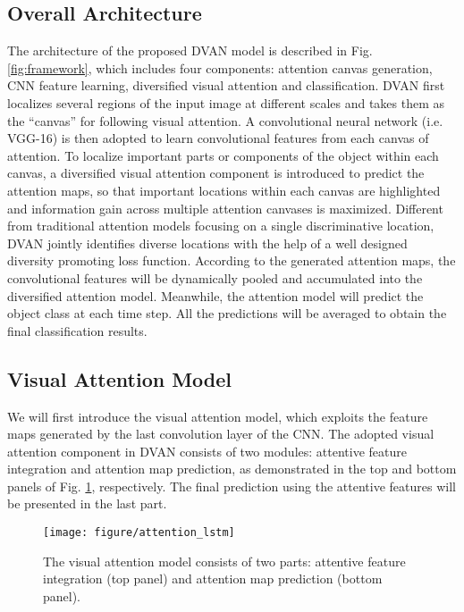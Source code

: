 \documentclass[journal]{IEEEtran}
\begin{document}
\subsection{Overall Architecture}
\label{sec:Arch}
The architecture of the proposed DVAN model is described in Fig. \ref{fig:framework}, which includes four components: attention canvas generation, CNN feature learning, diversified visual attention and classification. DVAN first localizes several regions of the input image at different scales and takes them as the ``canvas'' for following visual attention. A convolutional neural network (i.e. VGG-16) is then adopted to learn convolutional features from each canvas of attention. To localize important parts or components of the object within each canvas, a diversified visual attention component is introduced to predict the attention maps, so that important locations within each canvas are highlighted and information gain across multiple attention canvases is maximized. Different from traditional attention models focusing on a single discriminative location, DVAN jointly identifies diverse locations with the help of a well designed diversity promoting loss function. According to the generated attention maps, the convolutional features will be dynamically pooled and accumulated into the diversified attention model. Meanwhile, the attention model will predict the object class at each time step. All the predictions will be averaged to obtain the final classification results.

\subsection{Visual Attention Model}
\label{sec:VAM}
We will first introduce the visual attention model, which exploits the feature maps generated by the last convolution layer of the CNN. The adopted visual attention component in DVAN consists of two modules: attentive feature integration and attention map prediction, as demonstrated in the top and bottom panels of Fig. \ref{fig:attention_lstm}, respectively. The final prediction using the attentive features will be presented in the last part.

\begin{figure}[!t]
  \centering
  \texttt{[image: figure/attention\_lstm]}
  \vspace{-0.1in}  
  \caption{The visual attention model consists of two parts: attentive feature integration (top panel) and attention map prediction (bottom panel).}
  \label{fig:attention_lstm}
  \vspace{-0.2in}
\end{figure}
\end{document}

